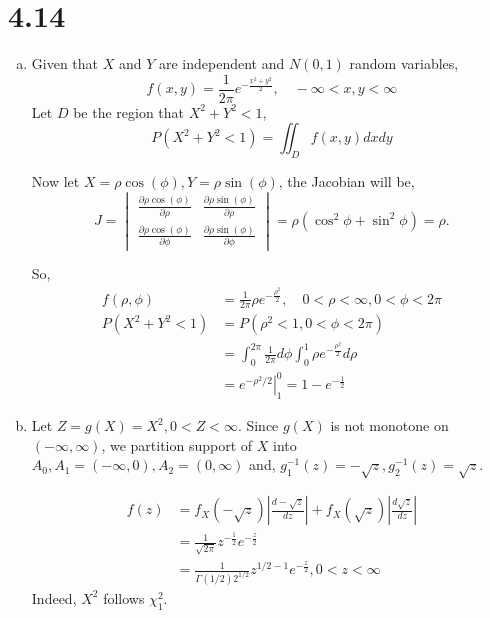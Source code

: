 \documentclass[letterpaper]{article}
\begin{document}
    \section*{4.14}
    \begin{enumerate}[(a)]
     	\item Given that $X$ and $Y$ are independent and $N(0,1)$ random variables,
     	\[
     	f(x, y) = \frac{1}{2\pi} e^{-\frac{x^2 + y^2}{2}}, \quad -\infty < x, y < \infty
     	\]
     	Let $D$ be the region that $X^2 + Y^2 < 1$, 
     	\[
     	P(X^2 + Y^2 < 1) = \iint_D f(x, y) dxdy
     	\]
     	
     	Now let $X = \rho \cos(\phi), Y = \rho \sin(\phi)$, the Jacobian will be,
     	\[
     	J = \begin{vmatrix}
     	\frac{\partial \rho \cos(\phi)}{\partial \rho} & \frac{\partial \rho \sin(\phi)}{\partial \rho} \\
     	\frac{\partial \rho \cos(\phi)}{\partial \phi} & \frac{\partial \rho \sin(\phi)}{\partial \phi}
     	\end{vmatrix} = \rho (\cos^2 \phi + \sin^2 \phi) = \rho.
     	\]
     	
     	So, 
     	\begin{align*}
     	f(\rho, \phi) & = \frac{1}{2\pi} \rho e^{-\frac{\rho^2}{2}}, \quad 0 < \rho < \infty, 0 < \phi < 2\pi \\
     	P(X^2 + Y^2 < 1) & = P(\rho^2 < 1, 0 < \phi < 2\pi) \\
     	& = \int_0^{2\pi} \frac{1}{2\pi} d\phi \int_0^1 \rho e^{-\frac{\rho^2}{2}} d\rho \\
     	& = \left. e^{-\rho^2/2} \right|^0_1 = 1 - e^{-\frac{1}{2}}
     	\end{align*}
	\item Let $Z = g(X) = X^2, 0 < Z < \infty$. Since $g(X)$ is not monotone on $(-\infty, \infty)$, we partition support of $X$ into $A_0, A_1 = (-\infty, 0), A_2 = (0, \infty)$ and, $g^{-1}_1(z) = -\sqrt{z}, g^{-1}_2(z) = \sqrt{z}$.
	
	\begin{align*}
	f(z) &= f_X(-\sqrt{z}) \left| \frac{d -\sqrt{z}}{dz} \right| + f_X(\sqrt{z}) \left| \frac{d\sqrt{z}}{dz} \right| \\
	& = \frac{1}{\sqrt{2\pi}} z^{-\frac{1}{2}} e^{-\frac{z}{2}} \\
	& = \frac{1}{\Gamma(1/2) 2^{1/2}} z^{1/2-1} e^{-\frac{z}{2}}, 0 < z < \infty
	\end{align*}
	Indeed, $X^2$ follows $\chi_1^2$.
	

\end{enumerate}
\end{document}
